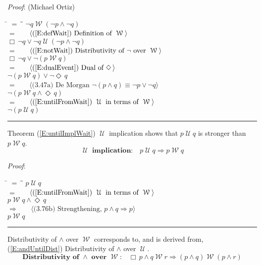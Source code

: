 \documentclass[12pt, fleqn, leqno]{article}
\newcommand{\lgap}{2pt}                             %
\newcommand{\mymathindent}{24pt}                    %
\newcommand{\impl}{\ensuremath{\Rightarrow}}        %
\newcommand{\Until}{\;\mathcal{U}\;}
\newcommand{\Wait}{\;\mathcal{W}\;}
\newcommand{\Event}{\Diamond\,}
\newcommand{\Always}{\Box\,}
\newcommand{\myqed}{\rule[-.23ex]{1.2ex}{2.0ex}}
\newcommand{\myqedtab}{\hspace{384pt}}              %
\newcommand{\Gll} {\langle}                         %
\newcommand{\Ggg} {\rangle}                         %
\newcommand{\Hint}[1]     {\ \ \ $\Gll              \mbox{#1} \Ggg$ }   %
\begin{document}
\emph{Proof}: (Michael Ortiz)
\begin{tabbing}
\hspace{\mymathindent} \= $= \;$ \= \myqedtab \= \kill
\> \> $\neg q \Wait (\neg p \land \neg q)$\\[\lgap]
\> $=$ \> \Hint{(\ref{E:defWait}) Definition of $\Wait$} \\[\lgap]
\> \> $\Always\neg q \lor \neg q\Until (\neg p \land \neg q)$\\[\lgap]
\> $=$ \> \Hint{(\ref{E:notWait}) Distributivity of $\neg$ over $\Wait$} \\[\lgap]
\> \> $\Always\neg q \lor \neg (p \Wait q)$\\[\lgap]
\> $=$  \>  \Hint{(\ref{E:dualEvent}) Dual of $\Event$}\\[\lgap]
\> \> $\neg (p \Wait q) \lor \neg\Event q $\\[\lgap]
\> $=$  \>  \Hint{(3.47a) De Morgan $\neg (p \land q) \equiv \neg p \lor \neg q$}\\[\lgap]
\> \> $\neg (p \Wait q \land \Event q)$\\[\lgap]
\> $=$  \>  \Hint{(\ref{E:untilFromWait}) $\Until$ in terms of $\Wait$}\\[\lgap]
\> \> $\neg (p \Until q)$ \quad \myqed
\end{tabbing}

Theorem (\ref{E:untilImplWait}) $\Until$ implication shows that $p\Until q$ is stronger than $p\Wait q$.
\begin{equation}\label{E:untilImplWait}
\textbf{$\Until$ implication:}\quad p\Until q\impl p\Wait q
\end{equation}

\emph{Proof}:
\begin{tabbing}
\hspace{\mymathindent} \= $= \;$ \= \myqedtab \= \kill
\> \> $p\Until q$\\[\lgap]
\> $=$ \> \Hint{(\ref{E:untilFromWait}) $\Until$ in terms of $\Wait$} \\[\lgap]
\> \> $p \Wait q\land \Event q$\\[\lgap]
\> $\impl$ \> \Hint{(3.76b) Strengthening, $p\land q \impl p$} \\[\lgap]
\> \> $p \Wait q$ \quad \myqed
\end{tabbing}

Distributivity of $\land$ over $\Wait$ corresponds to, and is derived from, (\ref{E:andUntilDist}) Distributivity of $\land$ over $\Until$.
\begin{equation}\label{E:andWaitDist}
\textbf{Distributivity of $\land$ over $\Wait$:}\quad \Always p \land q \Wait r \impl (p \land q) \Wait (p \land r)
\end{equation}
\end{document}
